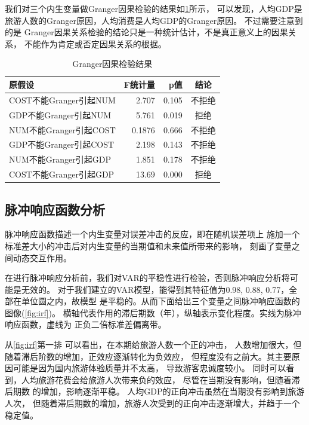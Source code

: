 \documentclass{article}
\def\NUM{\mathrm{NUM}}
\def\COST{\mathrm{COST}}
\def\GDP{\mathrm{GDP}}
\begin{document}
    我们对三个内生变量做Granger因果检验的结果如\cref{tab:granger}所示，
    可以发现，人均GDP是旅游人数的Granger原因，人均消费是人均GDP的Granger原因。
    不过需要注意到的是
    Granger因果关系检验的结论只是一种统计估计，不是真正意义上的因果关系，
    不能作为肯定或否定因果关系的根据。

    \begin{table}[h]
        \caption{Granger因果检验结果}
        \label{tab:granger}
        \centering
        \begin{tabular}{lrrc}
            \toprule
            原假设 & F统计量 & p值 & 结论 \\
            \midrule
            $\COST$不能Granger引起$\NUM$ & 2.707  & 0.105 & 不拒绝 \\
            $\GDP$不能Granger引起$\NUM$  & 5.761  & 0.019 & 拒绝 \\
            $\NUM$不能Granger引起$\COST$ & 0.1876 & 0.666 & 不拒绝 \\
            $\GDP$不能Granger引起$\COST$ & 2.198  & 0.143 & 不拒绝 \\
            $\NUM$不能Granger引起$\GDP$  & 1.851  & 0.178 & 不拒绝 \\
            $\COST$不能Granger引起$\GDP$ & 13.69  & 0.000 & 拒绝 \\
            \bottomrule
        \end{tabular}
    \end{table}

    \subsection{脉冲响应函数分析}
    脉冲响应函数描述一个内生变量对误差冲击的反应，即在随机误差项上
    施加一个标准差大小的冲击后对内生变量的当期值和未来值所带来的影响，
    刻画了变量之间动态交互作用。

    在进行脉冲响应分析前，我们对VAR的平稳性进行检验，否则脉冲响应分析将可能是无效的。
    对于我们建立的VAR模型，能得到其特征值为0.98, 0.88, 0.77，全部在单位圆之内，故模型
    是平稳的。从而下面给出三个变量之间脉冲响应函数的图像(\cref{fig:irf})。
    横轴代表作用的滞后期数（年），纵轴表示变化程度。实线为脉冲响应函数，虚线为
    正负二倍标准差偏离带。

    从\cref{fig:irf}第一排
    可以看出，在本期给旅游人数一个正的冲击，
    人数增加很大，但随着滞后阶数的增加，正效应逐渐转化为负效应，
    但程度没有之前大。其主要原因可能是因为国内旅游体验质量并不太高，
    导致游客忠诚度较小。
    同时可以看到，人均旅游花费会给旅游人次带来负的效应，
    尽管在当期没有影响，但随着滞后期数
    的增加，影响逐渐平稳。
    人均GDP的正向冲击虽然在当期没有影响到旅游人次，
    但随着滞后期数的增加，旅游人次受到的正向冲击逐渐增大，并趋于一个稳定值。
\end{document}
